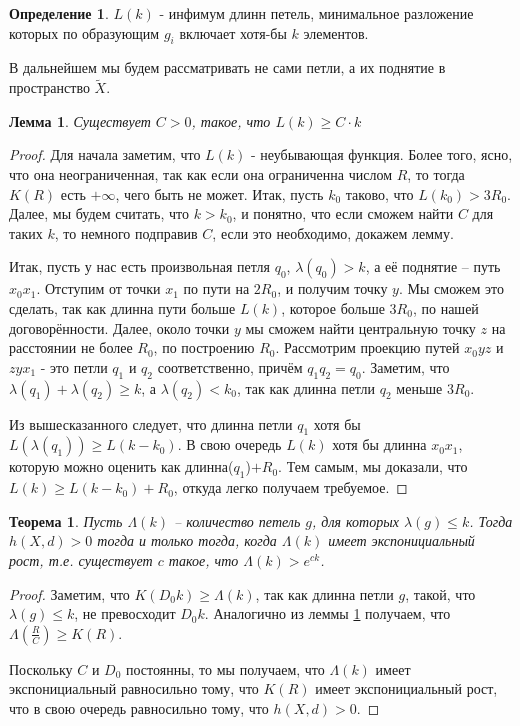 \documentclass[11pt]{article}
\theoremstyle{definition}
\newtheorem{defin}{Определение}%
\theoremstyle{plain}
\theoremstyle{plain}
\newtheorem{lemma}{Лемма}
\newtheorem{theorem}{Теорема}
\def\leq{\leqslant}
\def\geq{\geqslant}
\def\wt#1{\widetilde{#1}}
\begin{document}
\begin{defin}
	$L(k)$ - инфимум длинн петель, минимальное разложение которых по образующим $g_i$ включает хотя-бы $k$ элементов.
\end{defin}
В дальнейшем мы будем рассматривать не сами петли, а их поднятие в пространство $\wt{X}$.

\begin{lemma}\label{l_C}
Существует $C > 0$, такое, что $L(k) \geq C \cdot k$
\end{lemma}
\begin{proof}
Для начала заметим, что $L(k)$ - неубывающая функция. Более того, ясно, что она неограниченная, так как если она ограниченна числом $R$, 
то тогда $K(R)$ есть $+\infty$, чего быть не может. Итак, пусть $k_0$ таково, что $L(k_0) > 3 R_0$.
Далее, мы будем считать, что $k > k_0$, и понятно, что если сможем найти $C$ для таких $k$, то немного подправив $C$, если это необходимо, докажем лемму.

Итак, пусть у нас есть произвольная петля $q_0$, $\lambda(q_0) > k$, а её поднятие -- путь $x_0 x_1$.
Отступим от точки $x_1$ по пути на $2R_0$, и получим точку $y$.
Мы сможем это сделать, так как длинна пути больше $L(k)$, которое больше $3R_0$, по нашей договорённости.
Далее, около точки $y$ мы сможем найти центральную точку $z$ на расстоянии не более $R_0$, по построению $R_0$.
Рассмотрим проекцию путей $x_0yz$ и $zyx_1$ - это петли $q_1$ и $q_2$ соответственно, причём $q_1q_2 = q_0$.
Заметим, что $\lambda(q_1) + \lambda(q_2) \geq k$, а $\lambda(q_2) < k_0$, так как длинна петли $q_2$ меньше $3R_0$. 

Из вышесказанного следует, что длинна петли $q_1$ хотя бы $L(\lambda(q_1)) \geq L(k-k_0)$.
В свою очередь $L(k)$ хотя бы длинна $x_0x_1$, которую можно оценить как длинна($q_1$)$+ R_0$. 
Тем самым, мы доказали, что $L(k) \geq L(k-k_0) + R_0$, откуда легко получаем требуемое.
\end{proof}


\begin{theorem}
Пусть $\Lambda(k)$ -- количество петель $g$, для которых $\lambda(g) \leq k$. 
Тогда $h(X, d) > 0$ тогда и только тогда, когда $\Lambda(k)$ имеет экспонициальный рост, 
т.е. существует $c$ такое, что $\Lambda(k) > e^{ck}$.
\end{theorem}

\begin{proof}
Заметим, что $K(D_0 k) \geq \Lambda(k)$, так как длинна петли $g$, такой, что $\lambda(g) \leq k$, не превосходит $D_0 k$.
Аналогично из леммы \ref{l_C} получаем, что $\Lambda(\frac{R}{C}) \geq K(R)$.

Поскольку $C$ и $D_0$ постоянны, то мы получаем, что $\Lambda(k)$ имеет экспонициальный равносильно тому, что $K(R)$ имеет экспонициальный рост, 
что в свою очередь равносильно тому, что $h(X, d) > 0$.
\end{proof}
\end{document}
